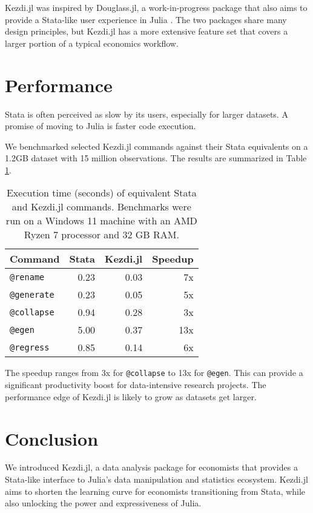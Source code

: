 \documentclass{juliacon}
\begin{document}
Kezdi.jl was inspired by Douglass.jl, a work-in-progress package that also aims to provide a Stata-like user experience in Julia \citep{Douglass.jl2023}. The two packages share many design principles, but Kezdi.jl has a more extensive feature set that covers a larger portion of a typical economics workflow.

\section{Performance}

Stata is often perceived as slow by its users, especially for larger datasets. A promise of moving to Julia is faster code execution. 

We benchmarked selected Kezdi.jl commands against their Stata equivalents on a 1.2GB dataset with 15 million observations. The results are summarized in Table \ref{tab:benchmark}.

\begin{table}[ht]
\centering
\begin{tabular}{lrrr}
\hline
Command & Stata & Kezdi.jl & Speedup \\
\hline
\texttt{@rename} & 0.23 & 0.03 & 7x \\
\texttt{@generate} & 0.23 & 0.05 & 5x\\
\texttt{@collapse} & 0.94 & 0.28 & 3x\\
\texttt{@egen} & 5.00 & 0.37 & 13x\\
\texttt{@regress} & 0.85 & 0.14 & 6x\\
\hline
\end{tabular}
\caption{Execution time (seconds) of equivalent Stata and Kezdi.jl commands. Benchmarks were run on a Windows 11 machine with an AMD Ryzen 7 processor and 32 GB RAM.}
\label{tab:benchmark}
\end{table}

The speedup ranges from 3x for \texttt{@collapse} to 13x for \texttt{@egen}. This can provide a significant productivity boost for data-intensive research projects. The performance edge of Kezdi.jl is likely to grow as datasets get larger.

\section{Conclusion}

We introduced Kezdi.jl, a data analysis package for economists that provides a Stata-like interface to Julia's data manipulation and statistics ecosystem. Kezdi.jl aims to shorten the learning curve for economists transitioning from Stata, while also unlocking the power and expressiveness of Julia.
\end{document}
